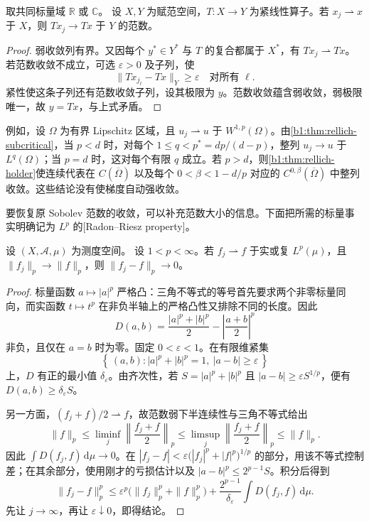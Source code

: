 \begin{proposition}\label{b1:prop:compact-weak-to-strong}
取共同标量域 \(\mathbb R\) 或 \(\mathbb C\)。
设 \(X,Y\) 为赋范空间，\(T:X\rightarrow Y\) 为紧线性算子。若
\(x_j\rightharpoonup x\) 于 \(X\)，则 \(Tx_j\to Tx\) 于 \(Y\) 的范数。
\end{proposition}
\begin{proof}
弱收敛列有界。又因每个 \(y^*\in Y^*\) 与 \(T\) 的复合都属于 \(X^*\)，有
\(Tx_j\rightharpoonup Tx\)。若范数收敛不成立，可选 \(\varepsilon>0\) 及子列，使
\[
 \|Tx_{j_\ell}-Tx\|_Y\ge\varepsilon
 \quad\text{对所有 }\ell.
\]
紧性使这条子列还有范数收敛子列，设其极限为 \(y\)。范数收敛蕴含弱收敛，弱极限唯一，故 \(y=Tx\)，与上式矛盾。
\end{proof}

例如，设 \(\Omega\) 为有界 Lipschitz 区域，且
\(u_j\rightharpoonup u\) 于 \(W^{1,p}(\Omega)\)。由\cref{b1:thm:rellich-subcritical}，当 \(p<d\) 时，对每个 \(1\le q<p^*=dp/(d-p)\)，整列 \(u_j\to u\) 于 \(L^q(\Omega)\)；当 \(p=d\) 时，这对每个有限 \(q\) 成立。若 \(p>d\)，则\cref{b1:thm:rellich-holder}使连续代表在
\(C(\overline\Omega)\) 以及每个 \(0<\beta<1-d/p\) 对应的
\(C^{0,\beta}(\overline\Omega)\) 中整列收敛。这些结论没有使梯度自动强收敛。

\ProseParagraphBreak

要恢复原 Sobolev 范数的收敛，可以补充范数大小的信息。下面把所需的标量事实明确记为 \(L^p\) 的[Radon--Riesz property]。

\begin{lemma}\label{b1:lem:lp-weak-norm-strong}
设 \((X,\mathcal A,\mu)\) 为测度空间。
设 \(1<p<\infty\)。若 \(f_j\rightharpoonup f\) 于实或复 \(L^p(\mu)\)，且
\(\|f_j\|_p\to\|f\|_p\)，则 \(\|f_j-f\|_p\to0\)。
\end{lemma}
\begin{proof}
标量函数 \(a\mapsto|a|^p\) 严格凸：三角不等式的等号首先要求两个非零标量同向，而实函数 \(t\mapsto t^p\) 在非负半轴上的严格凸性又排除不同的长度。因此
\[
 D(a,b)=\frac{|a|^p+|b|^p}{2}
              -\left|\frac{a+b}{2}\right|^p
\]
非负，且仅在 \(a=b\) 时为零。固定 \(0<\varepsilon<1\)。在有限维紧集
\[
 \left\{\,(a,b):|a|^p+|b|^p=1,\ |a-b|\ge\varepsilon\,\right\}
\]
上，\(D\) 有正的最小值 \(\delta_\varepsilon\)。由齐次性，若
\(S=|a|^p+|b|^p\) 且 \(|a-b|\ge\varepsilon S^{1/p}\)，便有
\(D(a,b)\ge\delta_\varepsilon S\)。

另一方面，\((f_j+f)/2\rightharpoonup f\)，故范数弱下半连续性与三角不等式给出
\[
 \|f\|_p
 \le\liminf_j\left\|\frac{f_j+f}{2}\right\|_p
 \le\limsup_j\left\|\frac{f_j+f}{2}\right\|_p
 \le\|f\|_p.
\]
因此 \(\int D(f_j,f)\,\mathrm d\mu\to0\)。在
\(|f_j-f|<\varepsilon\bigl(|f_j|^p+|f|^p\bigr)^{1/p}\) 的部分，用该不等式控制差；在其余部分，使用刚才的亏损估计以及
\(|a-b|^p\le2^{p-1}S\)。积分后得到
\[
 \|f_j-f\|_p^p
 \le\varepsilon^p\bigl(\|f_j\|_p^p+\|f\|_p^p\bigr)
   +\frac{2^{p-1}}{\delta_\varepsilon}
       \int D(f_j,f)\,\mathrm d\mu.
\]
先让 \(j\to\infty\)，再让 \(\varepsilon\downarrow0\)，即得结论。
\end{proof}

